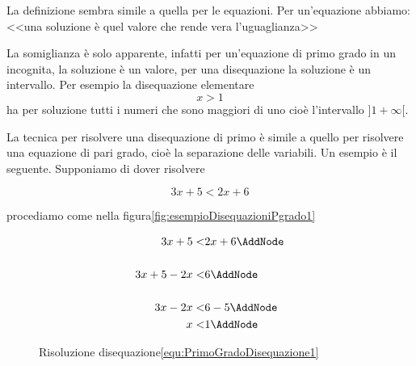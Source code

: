 La definizione sembra simile a quella per le equazioni. Per un'equazione abbiamo: <<una soluzione è quel valore che rende vera l'uguaglianza>>  
 
La somiglianza è solo apparente, infatti per un'equazione di primo grado in un incognita, la soluzione è un valore, per una disequazione la soluzione è un intervallo. Per esempio la disequazione elementare\begin{equation*}
	x>1
\end{equation*} ha per soluzione tutti i numeri che sono maggiori di uno cioè l'intervallo $] 1 +\infty [ $.

La tecnica per risolvere una disequazione di primo è simile a quello per risolvere una equazione di pari grado, cioè la separazione delle variabili. Un esempio è il seguente. Supponiamo di dover risolvere 
\begin{esempiot}{}{}
\begin{equation}
3x+5<2x+6\label{equ:PrimoGradoDisequazione1}
\end{equation}
\end{esempiot}
 procediamo come nella figura\nobs\vref{fig:esempioDisequazioniPgrado1}
\begin{figure}
	\begin{NodesList}
		\centering
		\begin{align*}
			3x+5<&2x+6\AddNode\\[.5cm] 
			3x+5-2x<&6\AddNode\\[.5cm] %
			3x-2x<&6-5\AddNode\\
			x<&1\AddNode
		\end{align*}
				\end{NodesList}
		\captionsetup{format=esempio,list=no}
	\caption{Risoluzione disequazione\nobs\vref{equ:PrimoGradoDisequazione1}}
	\label{fig:esempioDisequazioniPgrado1}
\end{figure}


